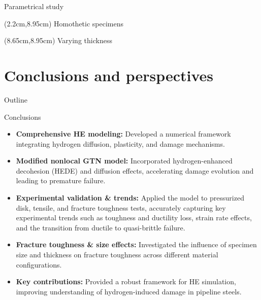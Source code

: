 \documentclass[9pt]{beamer}
\begin{document}
\begin{frame}{Parametrical study}
    \begin{textblock*}{5cm}(2.2cm,8.95cm)
        \small Homothetic specimens
    \end{textblock*}

    \begin{textblock*}{5cm}(8.65cm,8.95cm)
        \small Varying thickness
    \end{textblock*}
    
\end{frame}


\section{Conclusions and perspectives}

\begin{frame}{Outline}
	\tableofcontents[ 
    currentsubsection, 
    hideothersubsections, 
    sectionstyle=show/shaded, 
    subsectionstyle=show/shaded, 
    ] 
\end{frame}


\begin{frame}{Conclusions}

\begin{itemize}

	\item \textbf{Comprehensive HE modeling:} Developed a numerical framework integrating hydrogen diffusion, plasticity, and damage mechanisms.
	\vspace{0.15cm}
	\item \textbf{Modified nonlocal GTN model:} Incorporated hydrogen-enhanced decohesion (HEDE) and diffusion effects, accelerating damage evolution and leading to premature failure.
	\vspace{0.15cm}
	\item \textbf{Experimental validation \& trends:} Applied the model to pressurized disk, tensile, and fracture toughness tests, accurately capturing key experimental trends such as toughness and ductility loss, strain rate effects, and the transition from ductile to quasi-brittle failure.
	\vspace{0.15cm}
	\item \textbf{Fracture toughness \& size effects:} Investigated the influence of specimen size and thickness on fracture toughness across different material configurations.
	\vspace{0.15cm}
	\item \textbf{\textcolor{MINESBlue}{Key contributions:}} Provided a robust framework for HE simulation, improving understanding of hydrogen-induced damage in pipeline steels.
	
\end{itemize}

\end{frame}
\end{document}
